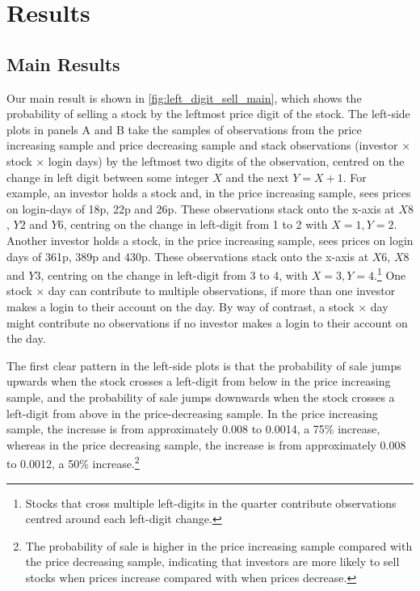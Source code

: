 \section{Results}

\subsection{Main Results}

Our main result is shown in \ref{fig:left_digit_sell_main}, which shows the probability of selling a stock by the leftmost price digit of the stock. The left-side plots in panels A and B take the samples of observations from the price increasing sample and price decreasing sample and stack observations (investor $\times$ stock $\times$ login days) by the leftmost two digits of the observation, centred on the change in left digit between some integer $X$ and the next $Y = X + 1$. For example, an investor holds a stock and, in the price increasing sample, sees prices on login-days of 18p, 22p and 26p. These observations stack onto the x-axis at $X8$, $Y2$ and $Y6$, centring on the change in left-digit from 1 to 2 with $X = 1 , Y = 2$. Another investor holds a stock, in the price increasing sample, sees prices on login days of 361p, 389p and 430p. These observations stack onto the x-axis at $X6$, $X8$ and $Y3$, centring on the change in left-digit from 3 to 4, with $X = 3 , Y = 4$.\footnote{Stocks that cross multiple left-digits in the quarter contribute observations centred around each left-digit change.} One stock $\times$ day can contribute to multiple observations, if more than one investor makes a login to their account on the day. By way of contrast, a stock $\times$ day might contribute no observations if no investor makes a login to their account on the day.

The first clear pattern in the left-side plots is that the probability of sale jumps upwards when the stock crosses a left-digit from below in the price increasing sample, and the probability of sale jumps downwards when the stock crosses a left-digit from above in the price-decreasing sample. In the price increasing sample, the increase is from approximately 0.008 to 0.0014, a 75\% increase, whereas in the price decreasing sample, the increase is from approximately 0.008 to 0.0012, a 50\% increase.\footnote{The probability of sale is higher in the price increasing sample compared with the price decreasing sample, indicating that investors are more likely to sell stocks when prices increase compared with when prices decrease.} 

